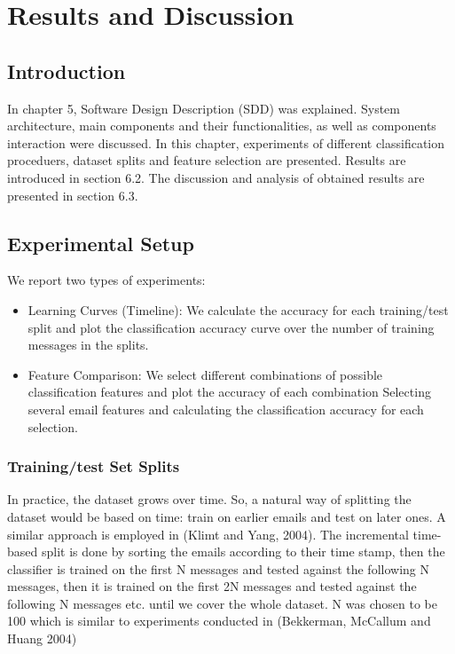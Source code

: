 
\chapter{Results and Discussion} %

\label{Chapter6} %




\section{Introduction} %
In chapter 5, Software Design Description (SDD) was explained. System architecture, main components and their functionalities, as well as components interaction were discussed. In this chapter, experiments of different classification proceduers, dataset splits and feature selection are presented. Results are introduced in section 6.2. The discussion and analysis of obtained results are presented in section 6.3.


\section{Experimental Setup}
We report two types of experiments:

\begin{itemize}
\item Learning Curves (Timeline): We calculate the accuracy for each training/test split and plot the classification accuracy curve over the number of training messages in the splits. %

\item Feature Comparison: We select different combinations of possible classification features and plot the accuracy of each combination
Selecting several email features and calculating the classification accuracy for each selection. 
\end{itemize}

\subsection{Training/test Set Splits}
In practice, the dataset grows over time. So, a natural way of splitting the dataset would be based on time: train on earlier emails and test on later ones. A similar approach is employed in (Klimt and Yang, 2004). %
The incremental time-based split is done by sorting the emails according to their time stamp, then the classifier is trained on the first N messages and tested against the following N messages, then it is trained on the first 2N messages and tested against the following N messages etc. until we cover the whole dataset. N was chosen to be 100 which is similar to experiments conducted in (Bekkerman, McCallum and Huang 2004)

